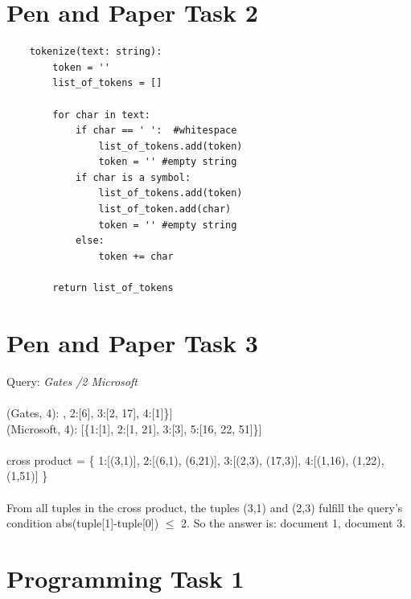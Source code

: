 \documentclass[a4paper]{scrartcl}
\begin{document}
\section*{Pen and Paper Task 2}
\begin{lstlisting}
    tokenize(text: string):
        token = ''
        list_of_tokens = []

        for char in text:
            if char == ' ':  #whitespace
                list_of_tokens.add(token)
                token = '' #empty string
            if char is a symbol:
                list_of_tokens.add(token)
                list_of_token.add(char)
                token = '' #empty string
            else:
                token += char
                
        return list_of_tokens

\end{lstlisting}

\clearpage
\section*{Pen and Paper Task 3}
Query: \textit{Gates /2 Microsoft}\\
\\
(Gates, 4): \quad \; [\{1:[3], 2:[6], 3:[2, 17], 4:[1]\}]\\
(Microsoft, 4): [\{1:[1], 2:[1, 21], 3:[3], 5:[16, 22, 51]\}]\\
\\
cross product = \{
  1:[(3,1)],
  2:[(6,1), (6,21)],
  3:[(2,3), (17,3)],
  4:[(1,16), (1,22), (1,51)]
\}\\
\\
From all tuples in the cross product, the tuples (3,1) and (2,3) fulfill the query's condition abs(tuple[1]-tuple[0]) $\leq$ 2. So the answer is: document 1, document 3.\\


\clearpage
\section*{Programming Task 1}

\end{document}
